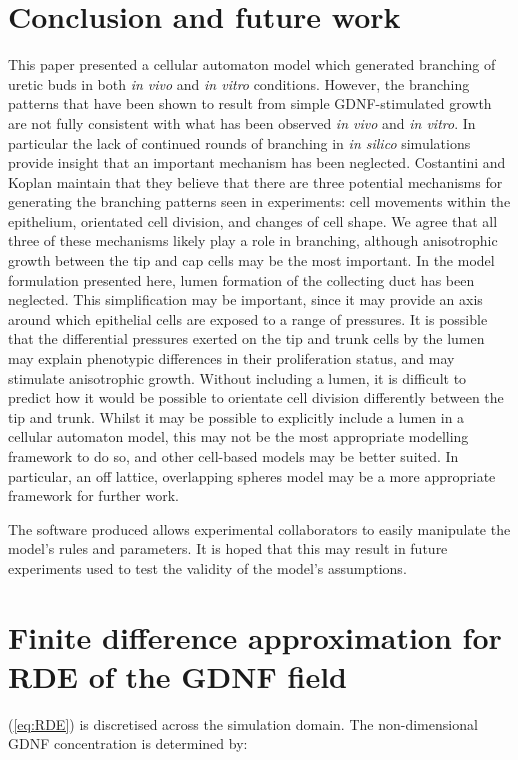 \documentclass[pdftex,10pt,a4paper,twocolumn]{article}
\begin{document}
\section{Conclusion and future work}
This paper presented a cellular automaton model which generated branching of uretic buds in both \textit{in vivo} and \textit{in vitro} conditions. However, the branching patterns that have been shown to result from simple GDNF-stimulated growth are not fully consistent with what has been observed \textit{in vivo} and \textit{in vitro}. In particular the lack of continued rounds of branching in \textit{in silico} simulations provide insight that an important mechanism has been neglected. Costantini and Koplan \cite{CostantiniFKopan2010} maintain that they believe that there are three potential mechanisms for generating the branching patterns seen in experiments: cell movements within the epithelium, orientated cell division, and changes of cell shape. We agree that all three of these mechanisms likely play a role in branching, although anisotrophic growth between the tip and cap cells may be the most important. In the model formulation presented here, lumen formation of the collecting duct has been neglected. This simplification may be important, since it may provide an axis around which epithelial cells are exposed to a range of pressures. It is possible that the differential pressures exerted on the tip and trunk cells by the lumen may explain phenotypic differences in their proliferation status, and may stimulate anisotrophic growth. Without including a lumen, it is difficult to predict how it would be possible to orientate cell division differently between the tip and trunk. Whilst it may be possible to explicitly include a lumen in a cellular automaton model, this may not be the most appropriate modelling framework to do so, and other cell-based models may be better suited. In particular, an off lattice, overlapping spheres model may be a more appropriate framework for further work.

The software produced allows experimental collaborators to easily manipulate the model's rules and parameters. It is hoped that this may result in future experiments used to test the validity of the model's assumptions.

\appendix
\section{Finite difference approximation for RDE of the GDNF field}\label{sec:GDNFfield}
(\ref{eq:RDE}) is discretised across the simulation domain. The non-dimensional GDNF concentration is determined by:
\end{document}
